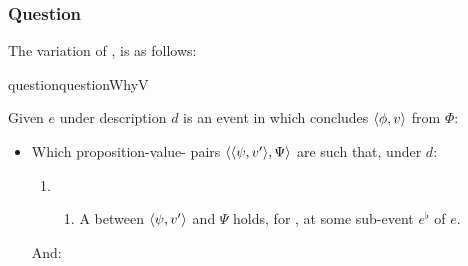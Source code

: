 \subsubsection{Question}
\label{cha:var:sec:vars:qwhyvnp:question}

\begin{note}
  The variation of \qWhy{}, \qWhyV{} is as follows:

  \begin{restatable}[\qWhyV{}]{question}{questionWhyV}
    \label{q:why:v}

    Given \(e\) under description \(d\) is an event in which \vAgent{} concludes \(\langle \phi, v \rangle\) from \(\Phi\):

    \begin{itemize}
    \item
      Which proposition-value-\poP{} pairs \(\langle \langle \psi, v' \rangle, \Psi \rangle\) are such that, under \(d\):

      \begin{enumerate}[label=]
      \item
        \begin{enumerate}[label=\alph*., ref=(\alph*), series=qWhyVdef]
        \item
          \label{q:why:v:a}
          A  between \(\langle \psi, v' \rangle\) and \(\Psi\) holds, for \vAgent{}, at some sub-event \(e^{\flat}\) of \(e\).
        \end{enumerate}
      \end{enumerate}

      And:


\end{itemize}
\end{restatable}
\end{note}
